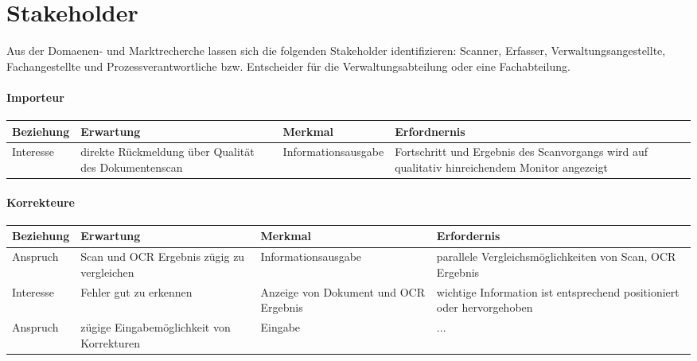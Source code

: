 \documentclass[11pt,oneside,a4paper,notitlepage]{article}
\begin{document}
\section{Stakeholder}

Aus der Domaenen- und Marktrecherche lassen sich die folgenden Stakeholder identifizieren: Scanner, Erfasser, Verwaltungsangestellte, Fachangestellte und Prozessverantwortliche bzw. Entscheider für die Verwaltungsabteilung oder eine Fachabteilung.\\

%
\paragraph*{Importeur}
\begin{center}
\begin{tabular}{| p{25mm} | p{5cm} | p{35mm} | p{5cm} |}
\hline
Beziehung & Erwartung  & Merkmal & Erfordnernis\\
\hline 
Interesse & direkte Rückmeldung über Qualität des Dokumentenscan & Informationsausgabe & Fortschritt und Ergebnis des Scanvorgangs wird auf qualitativ hinreichendem Monitor angezeigt \\
\hline
\end{tabular}
\end{center}
%


\paragraph*{Korrekteure}
\begin{center}
\begin{tabular}{| p{25mm} | p{5cm} | p{35mm} | p{5cm} |}
\hline
Beziehung & Erwartung & Merkmal & Erfordernis\\
\hline
Anspruch & Scan und OCR Ergebnis zügig zu vergleichen & Informationsausgabe & parallele Vergleichsmöglichkeiten von Scan, OCR Ergebnis \\
Interesse & Fehler gut zu erkennen & Anzeige von Dokument und OCR Ergebnis & wichtige Information ist entsprechend positioniert oder hervorgehoben\\ 
Anspruch & zügige Eingabemöglichkeit von Korrekturen & Eingabe   & ... \\
\hline
\end{tabular}
\end{center}
%
%
\end{document}
